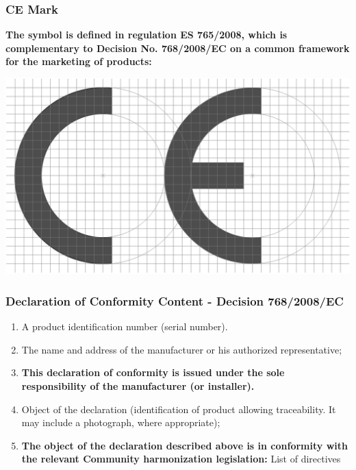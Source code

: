 \documentclass{beamer}
\begin{document}
	\begin{frame}
    \frametitle{CE Mark}
		\textbf{The symbol is defined in regulation ES 765/2008, which is complementary to Decision No. 768/2008/EC on a common framework for the marketing of products:}
		\begin{center}
			\includegraphics[scale=0.45]{obr03_ZnShodyCE.png} 
		\end{center}
	\end{frame}
	\begin{frame}
    \frametitle{Declaration of Conformity Content - Decision 768/2008/EC}
		\small
		\begin{enumerate}
			\item A product identification number (serial number).
			\item The name and address of the manufacturer or his authorized representative;
			\item \textbf{This declaration of conformity is issued under the sole responsibility of the manufacturer (or installer).}
			\item Object of the declaration (identification of product allowing traceability. It may include a photograph, where
appropriate);
			\item \textbf{The object of the declaration described above is in conformity with the relevant Community harmonization
legislation:} List of directives
		\end{enumerate}

	\end{frame}
\end{document}
